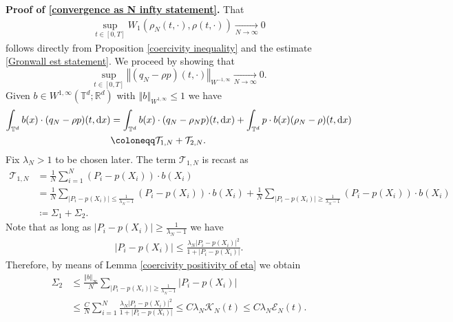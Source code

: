 \documentclass[11pt,reqno]{amsart}
\numberwithin{equation}{section}
\def\dd{{\rm d}}
\begin{document}
\vspace{0.4 cm}

\textbf{Proof of \eqref{convergence as N infty statement}.} That
\begin{align}
\underset{t\in [0,T]}{\sup}W_{1}(\rho_{N}(t,\cdot),\rho(t,\cdot))\underset{N\rightarrow \infty}{\rightarrow} 0  \label{Wasserstein ditance between rhoN and rho}
\end{align}
follows directly from Proposition \ref{coercivity inequality} and the estimate \eqref{Gronwall est statement}. We proceed by showing that $$\underset{t\in [0,T]}{\sup}\left\Vert (q_{N}-\rho p)(t,\cdot)\right\Vert_{W^{-1,\infty}}\underset{N\rightarrow \infty}{\rightarrow} 0.$$ Given $b\in W^{1,\infty}(\mathbb{T}^{d};\mathbb{R}^{d})$ with $\left\Vert b\right\Vert_{W^{1,\infty}}\leq 1$ we have  
\begin{align*}
\int_{\mathbb{T}^{d}} b(x)\cdot (q_{N}-\rho p)(t,\dd x)&=\int_{\mathbb{T}^{d}}b(x)\cdot (q_{N}-\rho_{N}p)(t,\dd x) +\int_{\mathbb{T}^{d}}p\cdot b(x)(\rho_{N}-\rho)(t,\dd x)\\
&\coloneqq \mathcal{T}_{1,N}+\mathcal{T}_{2,N}.     
\end{align*}
Fix $\lambda_{N}>1$ to be chosen later. The term $\mathcal{T}_{1,N}$ is recast as 
\begin{align*}
\mathcal{T}_{1,N}&=\frac{1}{N}\sum_{i=1}^{N}(P_{i}-p(X_{i}))\cdot b(X_{i})\\
&=\frac{1}{N}\sum_{\left\vert P_{i}-p(X_{i})\right\vert\leq \frac{1}{\lambda_{N} -1}}(P_{i}-p(X_{i}))\cdot b(X_{i})+\frac{1}{N}\sum_{\left\vert P_{i}-p(X_{i})\right\vert\geq \frac{1}{\lambda_{N} -1}}(P_{i}-p(X_{i}))\cdot b(X_{i})\\
&\coloneqq  \Sigma_{1}+\Sigma_{2}.
\end{align*}
Note that as long as $\left\vert P_{i}-p(X_{i})\right\vert\geq \frac{1}{\lambda_{N} -1}$ we have 
\begin{align*}
\left\vert P_{i}-p(X_{i})\right\vert\leq \frac{\lambda_{N} \left\vert P_{i}-p(X_{i})\right\vert^{2}}{1+\left\vert P_{i}-p(X_{i})\right\vert}. 
\end{align*}
Therefore, by means of  Lemma \ref{coercivity positivity of eta} we obtain 
\begin{align*}
\Sigma_{2}&\leq \frac{\left\Vert b\right\Vert_{\infty} }{N}\sum_{\left\vert P_{i}-p(X_{i})\right\vert\geq \frac{1}{\lambda_{N}-1}}\left\vert P_{i}-p(X_{i})\right\vert\\
&\leq \frac{C}{N}\sum_{i=1}^{N}\frac{\lambda_{N} \left\vert P_{i}-p(X_{i})\right\vert^{2}}{1+\left\vert P_{i}-p(X_{i})\right\vert}\leq C\lambda_{N}\mathcal{K}_{N}(t)\leq C\lambda_{N}\mathcal{E}_{N}(t). 
\end{align*}
\end{document}
